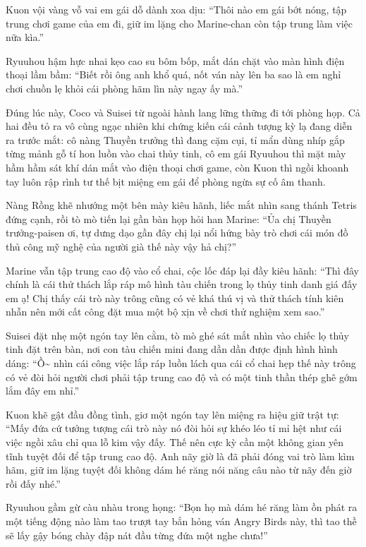 \documentclass[../main.tex]{subfiles}
\begin{document}
Kuon vội vàng vỗ vai em gái dỗ dành xoa dịu: ``Thôi nào em gái bớt nóng, tập trung chơi game của em đi, giữ im lặng cho Marine-chan còn tập trung làm việc nữa kìa.''

Ryuuhou hậm hực nhai kẹo cao su bôm bốp, mắt dán chặt vào màn hình điện thoại lầm bầm: ``Biết rồi ông anh khổ quá, nốt ván này lên ba sao là em nghỉ chơi chuồn lẹ khỏi cái phòng hãm lìn này ngay ấy mà.''

Đúng lúc này, Coco và Suisei từ ngoài hành lang lững thững đi tới phòng họp. Cả hai đều tỏ ra vô cùng ngạc nhiên khi chứng kiến cái cảnh tượng kỳ lạ đang diễn ra trước mắt: cô nàng Thuyền trưởng thì đang cặm cụi, tỉ mẩn dùng nhíp gắp từng mảnh gỗ tí hon luồn vào chai thủy tinh, cô em gái Ryuuhou thì mặt mày hầm hầm sát khí dán mắt vào điện thoại chơi game, còn Kuon thì ngồi khoanh tay luôn rập rình tư thế bịt miệng em gái để phòng ngừa sự cố âm thanh.

Nàng Rồng khẽ nhướng một bên mày kiêu hãnh, liếc mắt nhìn sang thánh Tetris đứng cạnh, rồi tò mò tiến lại gần bàn họp hỏi han Marine: ``Ủa chị Thuyền trưởng-paisen ơi, tự dưng dạo gần đây chị lại nổi hứng bày trò chơi cái món đồ thủ công mỹ nghệ của người già thế này vậy hả chị?''

Marine vẫn tập trung cao độ vào cổ chai, cộc lốc đáp lại đầy kiêu hãnh: ``Thì đây chính là cái thử thách lắp ráp mô hình tàu chiến trong lọ thủy tinh danh giá đấy em ạ! Chị thấy cái trò này trông cũng có vẻ khá thú vị và thử thách tính kiên nhẫn nên mới cất công đặt mua một bộ xịn về chơi thử nghiệm xem sao.''

Suisei đặt nhẹ một ngón tay lên cằm, tò mò ghé sát mắt nhìn vào chiếc lọ thủy tinh đặt trên bàn, nơi con tàu chiến mini đang dần dần được định hình hình dáng: ``Ồ\~{} nhìn cái công việc lắp ráp luồn lách qua cái cổ chai hẹp thế này trông có vẻ đòi hỏi người chơi phải tập trung cao độ và có một tinh thần thép ghê gớm lắm đây em nhỉ.''

Kuon khẽ gật đầu đồng tình, giơ một ngón tay lên miệng ra hiệu giữ trật tự: ``Mấy đứa cứ tưởng tượng cái trò này nó đòi hỏi sự khéo léo tỉ mỉ hệt như cái việc ngồi xâu chỉ qua lỗ kim vậy đấy. Thế nên cực kỳ cần một không gian yên tĩnh tuyệt đối để tập trung cao độ. Anh nãy giờ là đã phải đóng vai trò làm kìm hãm, giữ im lặng tuyệt đối không dám hé răng nói năng câu nào từ nãy đến giờ rồi đấy nhé.''

Ryuuhou gầm gừ càu nhàu trong họng: ``Bọn họ mà dám hé răng làm ồn phát ra một tiếng động nào làm tao trượt tay bắn hỏng ván Angry Birds này, thì tao thề sẽ lấy gậy bóng chày đập nát đầu từng đứa một nghe chưa!''
\end{document}
